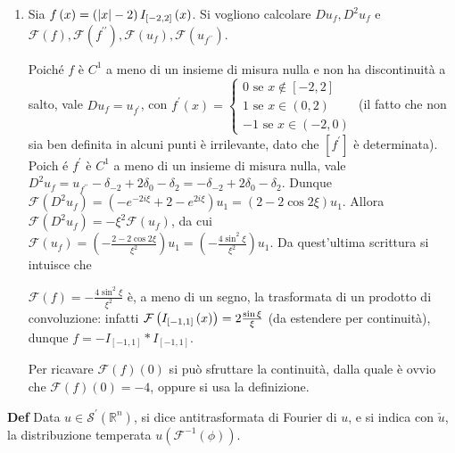 \documentclass{article}
\begin{document}
\begin{enumerate}
\item Sia $f\left( x\right) =\left( \left\vert x\right\vert -2\right) I_{%
\left[ -2,2\right] }\left( x\right) $. Si vogliono calcolare $%
Du_{f},D^{2}u_{f}$ e $\mathcal{F}\left( f\right) ,\mathcal{F}\left(
f^{\prime \prime }\right) ,\mathcal{F}\left( u_{f}\right) ,\mathcal{F}\left(
u_{f^{\prime \prime }}\right) $.

Poich\'{e} $f$ \`{e} $C^{1}$ a meno di un insieme di misura nulla e non ha
discontinuit\`{a} a salto, vale $Du_{f}=u_{f^{\prime }}$, con $f^{\prime
}\left( x\right) =\left\{ 
\begin{array}{c}
0\text{ se }x\not\in \left[ -2,2\right] \\ 
1\text{ se }x\in \left( 0,2\right) \\ 
-1\text{ se }x\in \left( -2,0\right)%
\end{array}%
\right. $ (il fatto che non sia ben definita in alcuni punti \`{e}
irrilevante, dato che $\left[ f^{\prime }\right] $ \`{e} determinata). Poich%
\'{e} $f^{\prime }$ \`{e} $C^{1}$ a meno di un insieme di misura nulla, vale 
$D^{2}u_{f}=u_{f^{\prime \prime }}-\delta _{-2}+2\delta _{0}-\delta
_{2}=-\delta _{-2}+2\delta _{0}-\delta _{2}$. Dunque $\mathcal{F}\left(
D^{2}u_{f}\right) =\left( -e^{-2i\xi }+2-e^{2i\xi }\right) u_{1}=\left(
2-2\cos 2\xi \right) u_{1}$. Allora $\mathcal{F}\left( D^{2}u_{f}\right)
=-\xi ^{2}\mathcal{F}\left( u_{f}\right) $, da cui $\mathcal{F}\left(
u_{f}\right) =\left( -\frac{2-2\cos 2\xi }{\xi ^{2}}\right) u_{1}=\left( -%
\frac{4\sin ^{2}\xi }{\xi ^{2}}\right) u_{1}$. Da quest'ultima scrittura si
intuisce che

$\mathcal{F}\left( f\right) =-\frac{4\sin ^{2}\xi }{\xi ^{2}}$ \`{e}, a meno
di un segno, la trasformata di un prodotto di convoluzione: infatti $%
\mathcal{F}\left( I_{\left[ -1,1\right] }\left( x\right) \right) =2\frac{%
\sin \xi }{\xi }$ (da estendere per continuit\`{a}), dunque $f=-I_{\left[
-1,1\right] }\ast I_{\left[ -1,1\right] }$.

Per ricavare $\mathcal{F}\left( f\right) \left( 0\right) $ si pu\`{o}
sfruttare la continuit\`{a}, dalla quale \`{e} ovvio che $\mathcal{F}\left(
f\right) \left( 0\right) =-4$, oppure si usa la definizione.
\end{enumerate}

\textbf{Def} Data $u\in \mathcal{S}^{\prime }\left( 
\mathbb{R}
^{n}\right) $, si dice antitrasformata di Fourier di $u$, e si indica con $%
\check{u}$, la distribuzione temperata $u\left( \mathcal{F}^{-1}\left( \phi
\right) \right) $.
\end{document}

